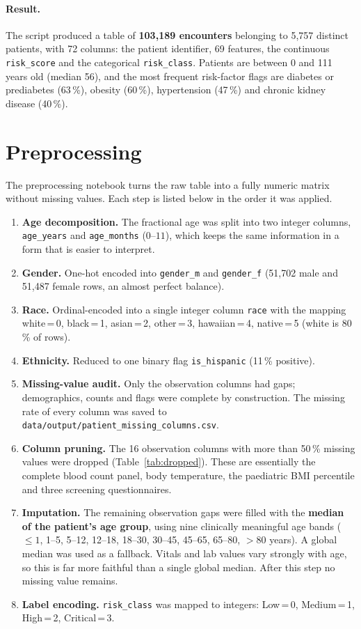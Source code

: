 \documentclass[11pt,a4paper]{article}
\newcommand{\code}[1]{\texttt{\textcolor{codegrey}{#1}}}
\newcommand{\sect}[1]{\section{#1}}
\begin{document}
\paragraph{Result.}
The script produced a table of \textbf{103{,}189 encounters} belonging to 5{,}757 distinct
patients, with 72 columns: the patient identifier, 69 features, the continuous
\code{risk\_score} and the categorical \code{risk\_class}. Patients are between 0 and 111 years
old (median 56), and the most frequent risk-factor flags are diabetes or prediabetes (63\,\%),
obesity (60\,\%), hypertension (47\,\%) and chronic kidney disease (40\,\%).

\sect{Preprocessing}

The preprocessing notebook turns the raw table into a fully numeric matrix without missing
values. Each step is listed below in the order it was applied.

\begin{enumerate}[itemsep=3pt]
  \item \textbf{Age decomposition.} The fractional age was split into two integer columns,
        \code{age\_years} and \code{age\_months} ($0$--$11$), which keeps the same information in a
        form that is easier to interpret.
  \item \textbf{Gender.} One-hot encoded into \code{gender\_m} and \code{gender\_f}
        (51{,}702 male and 51{,}487 female rows, an almost perfect balance).
  \item \textbf{Race.} Ordinal-encoded into a single integer column \code{race} with the mapping
        white\,=\,0, black\,=\,1, asian\,=\,2, other\,=\,3, hawaiian\,=\,4, native\,=\,5
        (white is 80\,\% of rows).
  \item \textbf{Ethnicity.} Reduced to one binary flag \code{is\_hispanic} (11\,\% positive).
  \item \textbf{Missing-value audit.} Only the observation columns had gaps; demographics,
        counts and flags were complete by construction. The missing rate of every column was
        saved to \code{data/output/patient\_missing\_columns.csv}.
  \item \textbf{Column pruning.} The 16 observation columns with more than 50\,\% missing values
        were dropped (Table~\ref{tab:dropped}). These are essentially the complete blood count
        panel, body temperature, the paediatric BMI percentile and three screening questionnaires.
  \item \textbf{Imputation.} The remaining observation gaps were filled with the \textbf{median
        of the patient's age group}, using nine clinically meaningful age bands
        ($\le 1$, 1--5, 5--12, 12--18, 18--30, 30--45, 45--65, 65--80, $>80$ years). A global
        median was used as a fallback. Vitals and lab values vary strongly with age, so this is
        far more faithful than a single global median. After this step no missing value remains.
  \item \textbf{Label encoding.} \code{risk\_class} was mapped to integers:
        Low\,=\,0, Medium\,=\,1, High\,=\,2, Critical\,=\,3.
\end{enumerate}
\end{document}
